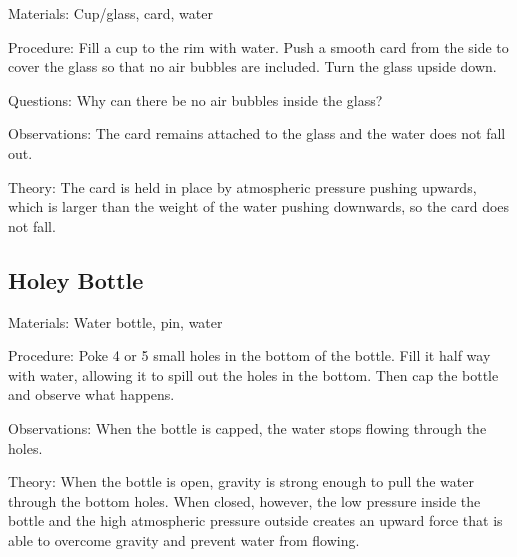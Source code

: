 \begin{multicols}{2}
\begin{description*}
\item[Materials:]{Cup/glass, card, water}
\item[Procedure:]{Fill a cup to the rim with water. Push a smooth card from the side to cover the glass so that no air bubbles are included. Turn the glass upside down.}
\item[Questions:]{Why can there be no air bubbles inside the glass?}
\item[Observations:]{The card remains attached to the glass and the water does not fall out.}
\item[Theory:]{The card is held in place by atmospheric pressure pushing upwards, which is larger than the weight of the water pushing downwards, so the card does not fall.}
\end{description*}

\subsection{Holey Bottle}


\begin{description*}
\item[Materials:]{Water bottle, pin, water}
\item[Procedure:]{Poke 4 or 5 small holes in the bottom of the bottle. Fill it half way with water, allowing it to spill out the holes in the bottom. Then cap the bottle and observe what happens.}
\item[Observations:]{When the bottle is capped, the water stops flowing through the holes.}
\item[Theory:]{When the bottle is open, gravity is strong enough to pull the water through the bottom holes. When closed, however, the low pressure inside the bottle and the high atmospheric pressure outside creates an upward force that is able to overcome gravity and prevent water from flowing.}
\end{description*}


\end{multicols}
